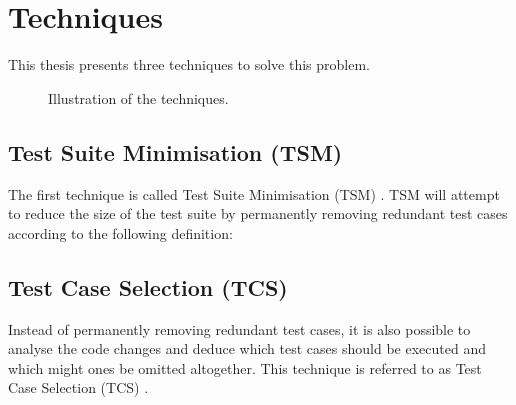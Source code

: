 \section{Techniques}
\noindent This thesis presents three techniques to solve this problem.

\begin{figure*}[t]
	\centering
	\hfill
	\hfill
	\caption{Illustration of the techniques.}
\end{figure*}

\subsection{Test Suite Minimisation (TSM)}
\noindent The first technique is called Test Suite Minimisation (TSM) \cite{10.1002/stv.430}. TSM will attempt to reduce the size of the test suite by permanently removing redundant test cases according to the following definition:\\

\noindent{}

\subsection{Test Case Selection (TCS)}
\noindent Instead of permanently removing redundant test cases, it is also possible to analyse the code changes and deduce which test cases should be executed and which might ones be omitted altogether. This technique is referred to as Test Case Selection (TCS) \cite{10.1002/stv.430}.\\

